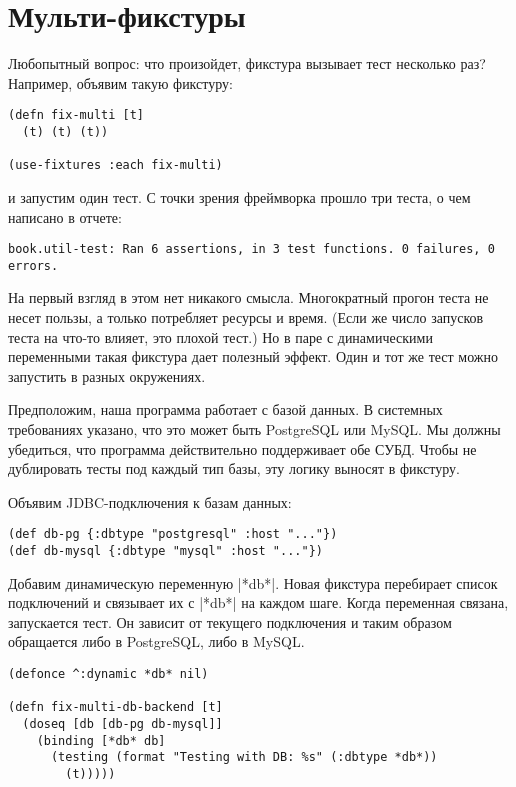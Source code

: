\section{Мульти-фикстуры}

Любопытный вопрос: что произойдет, фикстура вызывает тест несколько раз?
Например, объявим такую фикстуру:

\begin{verbatim}
(defn fix-multi [t]
  (t) (t) (t))

(use-fixtures :each fix-multi)
\end{verbatim}

и запустим один тест. С точки зрения фреймворка прошло три теста, о чем написано
в отчете:

\begin{verbatim}
book.util-test: Ran 6 assertions, in 3 test functions. 0 failures, 0 errors.
\end{verbatim}

На первый взгляд в этом нет никакого смысла. Многократный прогон теста не несет
пользы, а только потребляет ресурсы и время. (Если же число запусков теста на
что-то влияет, это плохой тест.) Но в паре с динамическими переменными такая
фикстура дает полезный эффект. Один и тот же тест можно запустить в разных
окружениях.

Предположим, наша программа работает с базой данных. В системных требованиях
указано, что это может быть PostgreSQL или MySQL. Мы должны убедиться, что
программа действительно поддерживает обе СУБД. Чтобы не дублировать тесты под
каждый тип базы, эту логику выносят в фикстуру.

Объявим JDBC-подключения к базам данных:

\begin{verbatim}
(def db-pg {:dbtype "postgresql" :host "..."})
(def db-mysql {:dbtype "mysql" :host "..."})
\end{verbatim}

Добавим динамическую переменную \spverb|*db*|. Новая фикстура перебирает список
подключений и связывает их с \spverb|*db*| на каждом шаге. Когда переменная связана,
запускается тест. Он зависит от текущего подключения и таким образом обращается
либо в PostgreSQL, либо в MySQL.

\begin{verbatim}
(defonce ^:dynamic *db* nil)

(defn fix-multi-db-backend [t]
  (doseq [db [db-pg db-mysql]]
    (binding [*db* db]
      (testing (format "Testing with DB: %s" (:dbtype *db*))
        (t)))))
\end{verbatim}

